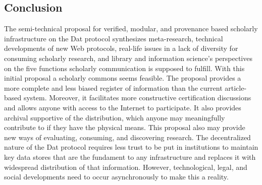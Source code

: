\documentclass[publications,article,submit,moreauthors,pdftex,10pt,a4paper]{Definitions/mdpi}
\begin{document}
\hypertarget{conclusion}{%
\subsection{Conclusion}\label{conclusion}}

The semi-technical proposal for verified, modular, and provenance
based scholarly infrastructure on the Dat protocol synthesizes
meta-research, technical developments of new Web protocols, real-life
issues in a lack of diversity for consuming scholarly research, and
library and information science's perspectives on the five functions
scholarly communication is supposed to fulfill. With this initial
proposal a scholarly commons seems feasible. The proposal provides a
more complete and less biased register of information than the current
article-based system. Moreover, it facilitates more constructive
certification discussions and allows anyone with access to the
Internet to participate. It also provides archival supportive of the
distribution, which anyone may meaningfully contribute to if they have
the physical means. This proposal also may provide new ways of
evaluating, consuming, and discovering research. The decentralized
nature of the Dat protocol requires less trust to be put in
institutions to maintain key data stores that are the fundament to any
infrastructure and replaces it with widespread distribution of that
information. However, technological, legal, and social developments
need to occur asynchronously to make this a reality.

\vspace{6pt} 



\end{document}
